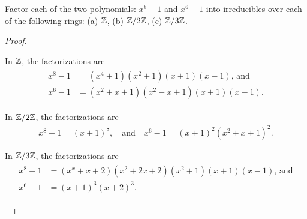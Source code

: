 \documentclass[10pt]{amsart}
\begin{document}
\begin{thm}
  \label{Ex5}
  Factor each of the two polynomials: $x^8 -1$ and $x^6 - 1$ into irreducibles over each of the following rings:
    (a) $\mathbb{Z}$, (b) $\mathbb{Z}/2\mathbb{Z}$, (c) $\mathbb{Z}/3\mathbb{Z}$.
  \begin{proof}
    \begin{alphaenum}
    \item
      In $\mathbb{Z}$, the factorizations are 
      \begin{align*}
        \begin{split}
          x^8 - 1 &= (x^4 + 1)(x^2 + 1)(x+1)(x-1), \,\text{and}\\
          x^6 - 1 &= (x^2+x+1)(x^2-x+1)(x+1)(x-1).
        \end{split}
      \end{align*}
    \item
      In $\mathbb{Z}/2\mathbb{Z}$, the factorizations are 
      \begin{align*}
        x^8 - 1 = (x+1)^8, \quad \text{and} \quad  x^6 - 1 = (x + 1)^2(x^2 + x + 1)^2.
      \end{align*}
    \item
      In $\mathbb{Z}/3\mathbb{Z}$, the factorizations are 
      \begin{align*}
        \begin{split}
          x^8 - 1 &= (x^x+x+2)(x^2+2x+2)(x^2+1)(x+1)(x-1), \,\text{and}\\
          x^6 - 1 &= (x+1)^3(x+2)^3.
        \end{split}
      \end{align*}
    \end{alphaenum}
  \end{proof}
\end{thm}
\end{document}
